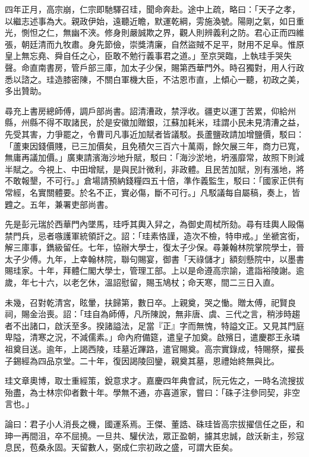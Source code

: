 \begin{pinyinscope}
四年正月，高宗崩，仁宗即馳驛召珪，聞命奔赴。途中上疏，略曰：「天子之孝，以繼志述事為大。親政伊始，遠聽近瞻，默運乾綱，雱施渙號。陽剛之氣，如日重光，惻怛之仁，無幽不浹。修身則嚴誠欺之界，觀人則辨義利之防。君心正而四維張，朝廷清而九牧肅。身先節儉，崇獎清廉，自然盜賊不足平，財用不足阜。惟原皇上無忘堯、舜自任之心，臣敢不勉行義事君之道。」至京哭臨，上執珪手哭失聲。命直南書房，管戶部三庫，加太子少保，賜第西華門外。時召獨對，用人行政悉以諮之。珪造膝密陳，不關白軍機大臣，不沽恩市直，上傾心一聽，初政之美，多出贊助。

尋充上書房總師傅，調戶部尚書。詔清漕政，禁浮收。疆吏以運丁苦累，仰給州縣，州縣不得不取諸民，於是安徽加贈銀，江蘇加耗米，珪謂小民未見清漕之益，先受其害，力爭罷之，令曹司凡事近加賦者皆議駁。長蘆鹽政請加增鹽價，駁曰：「蘆東因錢價賤，已三加價矣，且免積欠三百六十萬兩，餘欠展三年，商力已寬，無庸再議加價。」廣東請濱海沙地升賦，駁曰：「海沙淤地，坍漲靡常，故照下則減半賦之。今視上、中田增賦，是與民計微利，非政體。且民苦加賦，別有漲地，將不敢報墾，不可行。」倉場請預納錢糧四五十倍，準作義監生，駁曰：「國家正供有常經，名實關體要。於名不正，實必傷，斷不可行。」凡駁議每自屬稿，奏上，皆韙之。五年，兼署吏部尚書。

先是彭元瑞於西華門內墜馬，珪呼其輿入舁之，為御史周栻所劾。尋有珪輿人毆傷禁門兵，忌者嗾護軍統領訐之。詔：「珪素恪謹，造次不檢，特申戒。」坐褫宮銜，解三庫事，鐫級留任。七年，協辦大學士，復太子少保。尋兼翰林院掌院學士，晉太子少傅。九年，上幸翰林院，聯句賜宴，御書「天祿儲才」額刻懸院中，以墨書賜珪家。十年，拜體仁閣大學士，管理工部。上以是命遵高宗諭，遣詣裕陵謝。逾歲，年七十六，以老乞休，溫詔慰留，賜玉鳩杖；命天寒，間二三日入直。

未幾，召對乾清宮，眩暈，扶歸第，數日卒。上親奠，哭之慟。贈太傅，祀賢良祠，賜金治喪。詔：「珪自為師傅，凡所陳說，無非唐、虞、三代之言，稍涉時趨者不出諸口，啟沃至多。揆諸謚法，足當『正』字而無愧，特謚文正。又見其門庭卑隘，清寒之況，不減儒素。」命內府備筵，遣皇子加奠。啟殯日，遣慶郡王永璘祖奠目送。逾年，上謁西陵，珪墓近蹕路，遣官賜奠。高宗實錄成，特賜祭，擢長子錫經為四品京堂。二十年，復因謁陵回鑾，親奠其墓，恩禮始終無與比。

珪文章奧博，取士重經策，銳意求才。嘉慶四年典會試，阮元佐之，一時名流搜拔殆盡，為士林宗仰者數十年。學無不通，亦喜道家，嘗曰：「硃子注參同契，非空言也。」

論曰：君子小人消長之機，國運系焉。王傑、董誥、硃珪皆高宗拔擢信任之臣，和珅一再間沮，卒不屈撓。一旦共、驩伏法，眾正盈朝，攄其忠誠，啟沃新主，殄寇息民，苞桑永固。天留數人，弼成仁宗初政之盛，可謂大臣矣。


\end{pinyinscope}